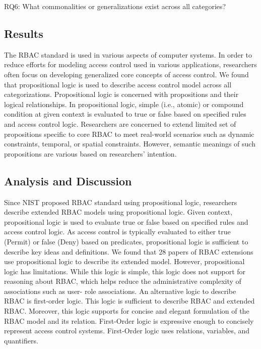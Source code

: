 RQ6: What commonalities or generalizations exist across all categories?

\subsection{Results}

The RBAC standard is used in various aspects of computer systems. In order to reduce efforts for modeling access control used in various applications, researchers often focus on developing generalized core concepts of access control.
We found that propositional logic is used to describe access control model across all categorizations. Propositional logic is concerned with propositions and their logical relationships. In propositional logic, simple (i.e., atomic) or compound condition at given context is evaluated to true or false based on specified rules and access control logic. Researchers are concerned to extend limited set of propositions specific to core RBAC to meet real-world scenarios such as dynamic constraints, temporal, or spatial constraints. However, semantic meanings of such propositions are various based on researchers' intention.

\subsection{Analysis and Discussion}

Since NIST proposed RBAC standard using propositional logic, researchers describe extended RBAC models using propositional logic. Given context, propositional logic is used to evaluate true or false based on specified rules and access control logic. As access control is typically evaluated to either true (Permit) or false (Deny) based on predicates, propositional logic is sufficient to describe key ideas and definitions. We found that 28 papers of RBAC extensions use propositional logic to describe its extended model.
However, propositional logic has limitations. While this logic is simple, this logic does not support for reasoning about RBAC, which helps reduce the administrative complexity of associations such as user- role associations. An alternative logic to describe RBAC is first-order logic. This logic is sufficient to describe RBAC and extended RBAC. Moreover, this logic supports for concise and elegant formulation of the RBAC model and its relation.  First-Order logic is expressive enough to concisely represent access control systems. First-Order logic uses relations, variables, and quantifiers.
